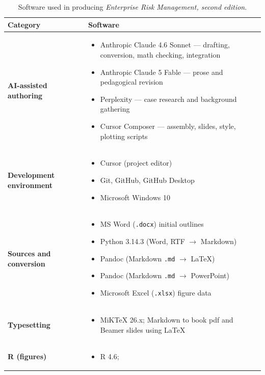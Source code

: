 \documentclass[11pt,letterpaper]{article}
\begin{document}
\begin{table}[htbp]
  \centering
  \caption{Software used in producing \textit{Enterprise Risk Management, second edition}.}
  \label{tab:software}
  \small
  \setlength{\tabcolsep}{4pt}
  \begin{tabularx}{\textwidth}{@{}>{\bfseries}l X@{}}
    \toprule
    Category & Software \\
    \midrule
    AI-assisted authoring &
    \begin{itemize}[nosep, leftmargin=*, topsep=0pt]
      \item Anthropic Claude 4.6 Sonnet --- drafting, conversion, math checking, integration
      \item Anthropic Claude 5 Fable --- prose and pedagogical revision
      \item Perplexity --- case research and background gathering
      \item Cursor Composer --- assembly, slides, style, plotting scripts
    \end{itemize} \\
    \addlinespace
    Development environment &
    \begin{itemize}[nosep, leftmargin=*, topsep=0pt]
      \item Cursor (project editor)
      \item Git, GitHub, GitHub Desktop
      \item Microsoft Windows 10
    \end{itemize} \\
    \addlinespace
    Sources and conversion &
    \begin{itemize}[nosep, leftmargin=*, topsep=0pt]
     \item MS Word (\texttt{.docx}) initial outlines
     \item Python 3.14.3 (Word, RTF  $\rightarrow$ Markdown) 
     \item Pandoc (Markdown \texttt{.md} $\rightarrow$ \LaTeX{})
     \item Pandoc (Markdown \texttt{.md} $\rightarrow$ PowerPoint)
     \item Microsoft Excel  (\texttt{.xlsx}) figure data
    \end{itemize} \\
    \addlinespace
    Typesetting &
    \begin{itemize}[nosep, leftmargin=*, topsep=0pt]
      \item MiKTeX 26.x; Markdown to book pdf and Beamer slides using \LaTeX
      
     \end{itemize} \\
    \addlinespace
    R (figures) &
    \begin{itemize}[nosep, leftmargin=*, topsep=0pt]
      \item R 4.6;
    \end{itemize} \\
    \bottomrule
  \end{tabularx}
  \vspace{2pt}
  
\end{table}
\end{document}
